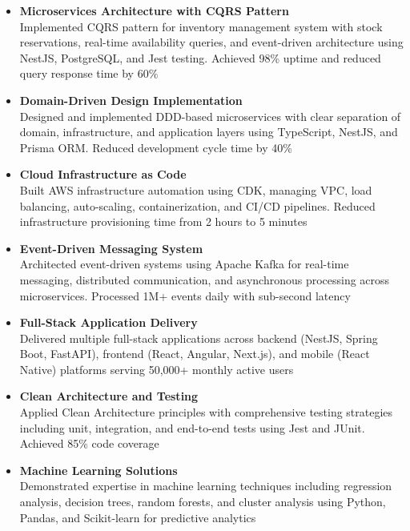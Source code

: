 \documentclass[10pt]{article}
\newcommand{\project}[1]{%
    \vspace{2pt}
    \textbf{#1}\\
}
\begin{document}
\begin{itemize}[leftmargin=*]
    \item \project{Microservices Architecture with CQRS Pattern} Implemented CQRS pattern for inventory management system with stock reservations, real-time availability queries, and event-driven architecture using NestJS, PostgreSQL, and Jest testing. Achieved 98\% uptime and reduced query response time by 60\%

    \item \project{Domain-Driven Design Implementation} Designed and implemented DDD-based microservices with clear separation of domain, infrastructure, and application layers using TypeScript, NestJS, and Prisma ORM. Reduced development cycle time by 40\%

    \item \project{Cloud Infrastructure as Code} Built AWS infrastructure automation using CDK, managing VPC, load balancing, auto-scaling, containerization, and CI/CD pipelines. Reduced infrastructure provisioning time from 2 hours to 5 minutes

    \item \project{Event-Driven Messaging System} Architected event-driven systems using Apache Kafka for real-time messaging, distributed communication, and asynchronous processing across microservices. Processed 1M+ events daily with sub-second latency

    \item \project{Full-Stack Application Delivery} Delivered multiple full-stack applications across backend (NestJS, Spring Boot, FastAPI), frontend (React, Angular, Next.js), and mobile (React Native) platforms serving 50,000+ monthly active users

    \item \project{Clean Architecture and Testing} Applied Clean Architecture principles with comprehensive testing strategies including unit, integration, and end-to-end tests using Jest and JUnit. Achieved 85\% code coverage

    \item \project{Machine Learning Solutions} Demonstrated expertise in machine learning techniques including regression analysis, decision trees, random forests, and cluster analysis using Python, Pandas, and Scikit-learn for predictive analytics
\end{itemize}
\end{document}
